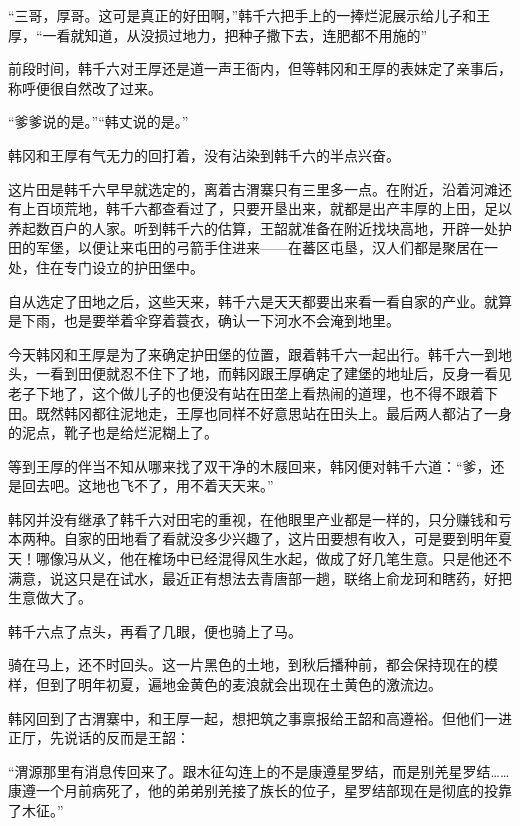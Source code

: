 “三哥，厚哥。这可是真正的好田啊，”韩千六把手上的一捧烂泥展示给儿子和王厚，“一看就知道，从没损过地力，把种子撒下去，连肥都不用施的”

前段时间，韩千六对王厚还是道一声王衙内，但等韩冈和王厚的表妹定了亲事后，称呼便很自然改了过来。

“爹爹说的是。”“韩丈说的是。”

韩冈和王厚有气无力的回打着，没有沾染到韩千六的半点兴奋。

这片田是韩千六早早就选定的，离着古渭寨只有三里多一点。在附近，沿着河滩还有上百顷荒地，韩千六都查看过了，只要开垦出来，就都是出产丰厚的上田，足以养起数百户的人家。听到韩千六的估算，王韶就准备在附近找块高地，开辟一处护田的军堡，以便让来屯田的弓箭手住进来——在蕃区屯垦，汉人们都是聚居在一处，住在专门设立的护田堡中。

自从选定了田地之后，这些天来，韩千六是天天都要出来看一看自家的产业。就算是下雨，也是要举着伞穿着蓑衣，确认一下河水不会淹到地里。

今天韩冈和王厚是为了来确定护田堡的位置，跟着韩千六一起出行。韩千六一到地头，一看到田便就忍不住下了地，而韩冈跟王厚确定了建堡的地址后，反身一看见老子下地了，这个做儿子的也便没有站在田垄上看热闹的道理，也不得不跟着下田。既然韩冈都往泥地走，王厚也同样不好意思站在田头上。最后两人都沾了一身的泥点，靴子也是给烂泥糊上了。

等到王厚的伴当不知从哪来找了双干净的木屐回来，韩冈便对韩千六道：“爹，还是回去吧。这地也飞不了，用不着天天来。”

韩冈并没有继承了韩千六对田宅的重视，在他眼里产业都是一样的，只分赚钱和亏本两种。自家的田地看了看就没多少兴趣了，这片田要想有收入，可是要到明年夏天！哪像冯从义，他在榷场中已经混得风生水起，做成了好几笔生意。只是他还不满意，说这只是在试水，最近正有想法去青唐部一趟，联络上俞龙珂和瞎药，好把生意做大了。

韩千六点了点头，再看了几眼，便也骑上了马。

骑在马上，还不时回头。这一片黑色的土地，到秋后播种前，都会保持现在的模样，但到了明年初夏，遍地金黄色的麦浪就会出现在土黄色的激流边。

韩冈回到了古渭寨中，和王厚一起，想把筑之事禀报给王韶和高遵裕。但他们一进正厅，先说话的反而是王韶：

“渭源那里有消息传回来了。跟木征勾连上的不是康遵星罗结，而是别羌星罗结……康遵一个月前病死了，他的弟弟别羌接了族长的位子，星罗结部现在是彻底的投靠了木征。”

